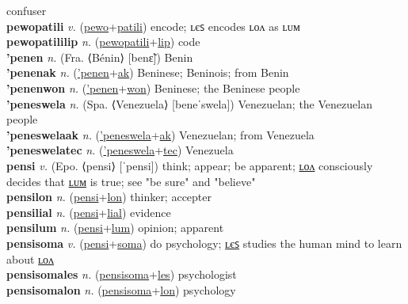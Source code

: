confuser \label{pewokiles} \\
\textbf{pewopatili} \textit{v.} (\hyperref[pewo]{pewo}+\hyperref[patili]{patili})
encode; ʟєꜱ encodes ʟᴏᴧ as ʟᴜᴍ \label{pewopatili} \\
\textbf{pewopatililip} \textit{n.} (\hyperref[pewopatili]{pewopatili}+\hyperref[lip]{lip})
code \label{pewopatililip} \\
\textbf{'penen} \textit{n.} (Fra. ⟨Bénin⟩ [benɛ̃])
Benin \label{'penen} \\
\textbf{'penenak} \textit{n.} (\hyperref['penen]{'penen}+\hyperref[ak]{ak})
Beninese; Beninois; from Benin \label{'penenak} \\
\textbf{'penenwon} \textit{n.} (\hyperref['penen]{'penen}+\hyperref[won]{won})
Beninese; the Beninese people \label{'penenwon} \\
\textbf{'peneswela} \textit{n.} (Spa. ⟨Venezuela⟩ [beneˈswela])
Venezuelan; the Venezuelan people \label{'peneswela} \\
\textbf{'peneswelaak} \textit{n.} (\hyperref['peneswela]{'peneswela}+\hyperref[ak]{ak})
Venezuelan; from Venezuela \label{'peneswelaak} \\
\textbf{'peneswelatec} \textit{n.} (\hyperref['peneswela]{'peneswela}+\hyperref[tec]{tec})
Venezuela \label{'peneswelatec} \\
\textbf{pensi} \textit{v.} (Epo. ⟨pensi⟩ [ˈpensi])
think; appear; be apparent; \hyperref[pensilon]{ʟᴏᴧ} consciously decides that \hyperref[pensilum]{ʟᴜᴍ} is true; see "be sure" and "believe" \label{pensi} \\
\textbf{pensilon} \textit{n.} (\hyperref[pensi]{pensi}+\hyperref[lon]{lon})
thinker; accepter \label{pensilon} \\
\textbf{pensilial} \textit{n.} (\hyperref[pensi]{pensi}+\hyperref[lial]{lial})
evidence \label{pensilial} \\
\textbf{pensilum} \textit{n.} (\hyperref[pensi]{pensi}+\hyperref[lum]{lum})
opinion; apparent \label{pensilum} \\
\textbf{pensisoma} \textit{v.} (\hyperref[pensi]{pensi}+\hyperref[soma]{soma})
do psychology; \hyperref[pensisomales]{ʟєꜱ} studies the human mind to learn about \hyperref[pensisomalon]{ʟᴏᴧ} \label{pensisoma} \\
\textbf{pensisomales} \textit{n.} (\hyperref[pensisoma]{pensisoma}+\hyperref[les]{les})
psychologist \label{pensisomales} \\
\textbf{pensisomalon} \textit{n.} (\hyperref[pensisoma]{pensisoma}+\hyperref[lon]{lon})
psychology \label{pensisomalon} \\
